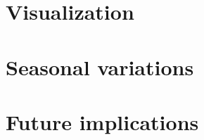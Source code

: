 \documentclass{article}
\title{
Exercise 2: IoT Data Analytics
\bigskip
\author{Andrei Golubev 2621924 \\ Hassan Shaheen 2600602}
\date{\parbox{\linewidth}{\centering
  \endgraf\bigskip
  University of Oulu, Oulu, Finland
  \endgraf\monthyeardate\today}}
}
\begin{document}
\maketitle
\thispagestyle{empty}
\newpage

\section{Visualization}

\section{Seasonal variations}

\section{Future implications}
\end{document}
